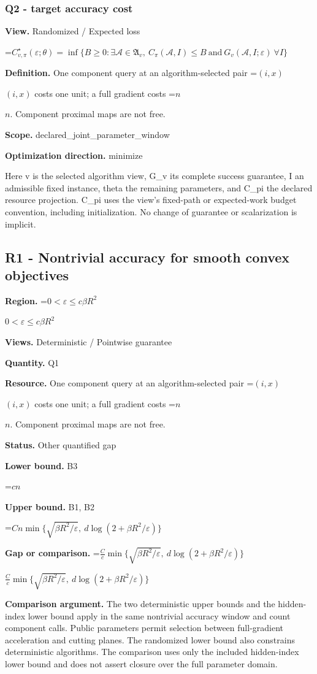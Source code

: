 \documentclass[10pt,a4paper]{article}
\newcommand{\AtlasMath}[1]{\par\begingroup\centering\setbox0=\hbox{$\displaystyle #1$}\ifdim\wd0>1.4\linewidth\typeout{ATLAS WIDE FORMULA: \the\wd0}\fi\ifdim\wd0>\linewidth\resizebox{\linewidth}{!}{\box0}\else\box0\fi\par\endgroup}
\newcommand{\AtlasInlineMath}[1]{\begingroup\setbox0=\hbox{$#1$}\ifdim\wd0>.4\linewidth\endgroup\AtlasMath{#1}\else\endgroup$#1$\fi}
\begin{document}
\subsubsection{Q2 - target accuracy cost}
\textbf{View.} Randomized / Expected loss

\AtlasMath{C^\star_{v,\pi}(\varepsilon;\theta)=\inf\{B\ge0:\exists\mathcal A\in\mathfrak A_v,\ C_\pi(\mathcal A,I)\le B\ \text{and}\ G_v(\mathcal A,I;\varepsilon)\ \forall I\}}
\textbf{Definition.} One component query at an algorithm-selected pair \AtlasInlineMath{(i,x)} costs one unit; a full gradient costs \AtlasInlineMath{n}. Component proximal maps are not free.

\textbf{Scope.} declared\_joint\_parameter\_window

\textbf{Optimization direction.} minimize

Here v is the selected algorithm view, G\_v its complete success guarantee, I an admissible fixed instance, theta the remaining parameters, and C\_pi the declared resource projection. C\_pi uses the view's fixed-path or expected-work budget convention, including initialization. No change of guarantee or scalarization is implicit.

\subsection{R1 - Nontrivial accuracy for smooth convex objectives}
\textbf{Region.} \AtlasInlineMath{0<\varepsilon\le c\beta R^2}

\textbf{Views.} Deterministic / Pointwise guarantee

\textbf{Quantity.} Q1

\textbf{Resource.} One component query at an algorithm-selected pair \AtlasInlineMath{(i,x)} costs one unit; a full gradient costs \AtlasInlineMath{n}. Component proximal maps are not free.

\textbf{Status.} Other quantified gap

\textbf{Lower bound.} B3

\AtlasMath{cn}
\textbf{Upper bound.} B1, B2

\AtlasMath{Cn\min\{\sqrt{\beta R^2/\varepsilon},\ d\log(2+\beta R^2/\varepsilon)\}}
\textbf{Gap or comparison.} \AtlasInlineMath{\frac{C}{c}\min\{\sqrt{\beta R^2/\varepsilon},\ d\log(2+\beta R^2/\varepsilon)\}}

\textbf{Comparison argument.} The two deterministic upper bounds and the hidden-index lower bound apply in the same nontrivial accuracy window and count component calls. Public parameters permit selection between full-gradient acceleration and cutting planes. The randomized lower bound also constrains deterministic algorithms. The comparison uses only the included hidden-index lower bound and does not assert closure over the full parameter domain.
\end{document}
